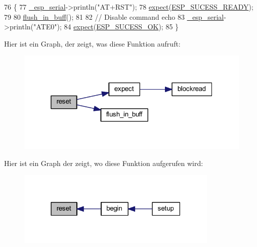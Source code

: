 \begin{DoxyCode}
76 \{
77   \hyperlink{class_esp_server_a552aab874ad99b696f4c997d6f5a4746}{\_esp\_serial}->println(\textcolor{stringliteral}{"AT+RST"});
78   \hyperlink{class_esp_server_aff5ea67ab96af075223b2b836036ccf1}{expect}(\hyperlink{_dumb_server_8cpp_af9850325c242ec48a5d70923c6147de5}{ESP\_SUCESS\_READY});
79 
80   \hyperlink{class_esp_server_a1d791edc8eca304acc71f702f07c0437}{flush\_in\_buff}();
81 
82   \textcolor{comment}{// Disable command echo}
83   \hyperlink{class_esp_server_a552aab874ad99b696f4c997d6f5a4746}{\_esp\_serial}->println(\textcolor{stringliteral}{"ATE0"});
84   \hyperlink{class_esp_server_aff5ea67ab96af075223b2b836036ccf1}{expect}(\hyperlink{_dumb_server_8cpp_a62497fcb12b1cedd5fdfbc0755508d87}{ESP\_SUCESS\_OK});
85 \}
\end{DoxyCode}
Hier ist ein Graph, der zeigt, was diese Funktion aufruft\+:\nopagebreak
\begin{figure}[H]
\begin{center}
\leavevmode
\includegraphics[width=319pt]{class_esp_server_ad20897c5c8bd47f5d4005989bead0e55_cgraph}
\end{center}
\end{figure}
Hier ist ein Graph der zeigt, wo diese Funktion aufgerufen wird\+:\nopagebreak
\begin{figure}[H]
\begin{center}
\leavevmode
\includegraphics[width=271pt]{class_esp_server_ad20897c5c8bd47f5d4005989bead0e55_icgraph}
\end{center}
\end{figure}
\mbox{\label{class_esp_server_a7968cc44a6c9fff24b9020e1714c49f8}} 
